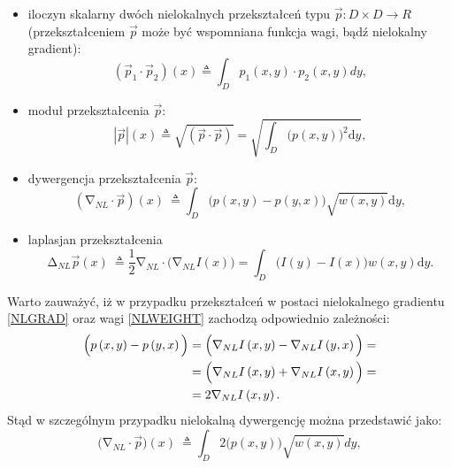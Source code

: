 \documentclass[12pt, twoside, openany]{report}
\theoremstyle{definition}
\begin{document}
\begin{itemize}
\item
iloczyn skalarny dwóch nielokalnych przekształceń typu $\overrightarrow{p}:D \times D \longrightarrow R$ (przekształceniem $\overrightarrow{p}$ może być wspomniana funkcja wagi, bądź nielokalny gradient):
\begin{equation}
\left({\overrightarrow{p}}_1\cdot {\overrightarrow{p}}_2\right)(x)\triangleq \int_D{p_1(x,y)\cdot p_2\left(x,y\right)dy}
\label{NLPRODUCT}
,
\end{equation}
\item
moduł przekształcenia $\overrightarrow{p}$:
\begin{equation}
\left|\overrightarrow{p}\right|\left(x\right)\triangleq \sqrt{(\overrightarrow{p}\cdot \overrightarrow{p})}=\sqrt{\int_D{{\big(p(x,y)\big)}^2\mathrm{d}y}}
\label{NLMOD}
,
\end{equation}
\item
dywergencja przekształcenia $\overrightarrow{p}$:
\begin{equation}
({\mathrm{\nabla }}_{NL}\cdot \overrightarrow{p})(x)\ \triangleq \int_D{\big(p\left(x,y\right)-p\left(y,x\right)\big)\sqrt{w(x,y)}\mathrm{d}y}
\label{NLDIV}
,
\end{equation}
\item
laplasjan przekształcenia
\begin{equation}
{\mathrm{\Delta }}_{NL}\overrightarrow{p}(x)\ \triangleq \frac{1}{2}{\mathrm{\nabla }}_{NL}\cdot \Big({\mathrm{\nabla }}_{NL}I\left(x\right)\Big)=\int_D{\Big(I\left(y\right)-I\left(x\right)\Big)w(x,y)\mathrm{d}y}
\label{NLLAP}
.
\end{equation}
\end{itemize}
Warto zauważyć, iż w przypadku przekształceń w postaci nielokalnego gradientu \eqref{NLGRAD} oraz wagi \eqref{NLWEIGHT} zachodzą odpowiednio zależności:
\begin{align}
\Big(p\left(x,y\right)-p\left(y,x\right)\Big) &= \Big({\mathrm{\nabla }}_{NL}I\left(x,y\right)-{\mathrm{\nabla }}_{NL}I\left(y,x\right)\Big)  \notag =\\ 
&= \Big({\mathrm{\nabla }}_{NL}I\left(x,y\right)+{\mathrm{\nabla }}_{NL}I\left(x,y\right)\Big) \notag =\\
&=2{\mathrm{\nabla }}_{NL}I\left(x,y\right) .
\label{NLPOM}
\end{align}
Stąd w szczególnym przypadku nielokalną dywergencję można przedstawić jako: 
\begin{equation}
\Big({\mathrm{\nabla }}_{NL}\cdot \overrightarrow{p}\Big)(x)\ \triangleq \int_D{2\Big(p\left(x,y\right)\Big)\sqrt{w(x,y)}dy}
\label{NLDIVSMART}
,
\end{equation}
\end{document}
